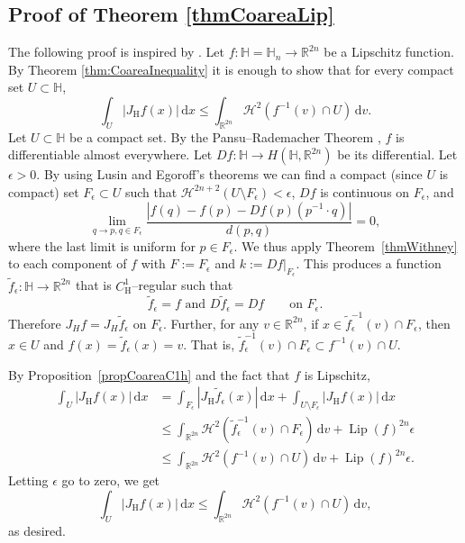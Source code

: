 \documentclass[12pt,reqno]{amsart}
\newcommand{\cH}{\mathcal{H}}
\newcommand{\JfH}{J_\mathrm{H}f}
\DeclareMathOperator{\Lip}{Lip}
\newcommand{\HH}{\mathbb{H}}
\newcommand{\R}{\mathbb{R}}
\newcommand{\ud}[0]{\,\mathrm{d}}
\newcommand{\from}{\colon}
\theoremstyle{remark}
\newcommand{\0}{\mathbf{0}}
\renewcommand{\1}{\mathbf 1}
\begin{document}
\subsection{Proof of Theorem \ref{thmCoareaLip}}

The following proof is inspired by \cite[Theorem 3.5]{MagnaniMathNachr}. Let $f\from \HH=\HH_n\to\mathbb R^{2n}$ be a Lipschitz function. By Theorem \ref{thm:CoareaInequality} it is enough to show that for every compact set $U\subset \HH$,
\begin{equation}\label{eqn:Sought}
    \int_U |\JfH(x)|\ud x \leq \int_{\mathbb R^{2n}}\mathcal{H}^2(f^{-1}(v)\cap U)\ud v.
    \end{equation}
Let $U\subset \HH$ be a compact set. By the Pansu--Rademacher Theorem \cite{Pansu, MagnaniPhD}, $f$ is differentiable almost everywhere. Let $Df\from \HH\to H(\HH,\mathbb R^{2n})$ be its differential. Let $\epsilon>0$. By using Lusin and Egoroff's theorems we can find a compact (since $U$ is compact) set $F_\epsilon\subset U$ such that $\cH^{2n+2}(U\setminus F_\epsilon)<\epsilon$, $Df$ is continuous on $F_\epsilon$, and
\[
    \lim_{q\to p, q\in F_\epsilon} \frac{|f(q)-f(p)-Df(p)(p^{-1}\cdot q)|}{d(p,q)}=0,
\]
where the last limit is uniform for $p\in F_\epsilon$. We thus apply Theorem~\ref{thmWithney} to each component of $f$ with $F:=F_\epsilon$ and $k:=Df|_{F_\epsilon}$. This produces a function $\tilde f_\epsilon\from \HH\to\mathbb R^{2n}$ that is $C^1_{\mathrm{H}}$--regular such that 
\begin{equation}\label{eqn:Fepsilon}
  \tilde f_\epsilon = f \text{ and } D\tilde f_\epsilon=Df \qquad \text{on $F_\epsilon$.}
\end{equation}
Therefore $J_Hf = J_H\tilde{f}_\epsilon$ on $F_\epsilon$. Further, for any $v\in \R^{2n}$, if $x\in \tilde f_\epsilon^{-1}(v)\cap F_\epsilon$, then $x\in U$ and $f(x) = \tilde f_{\epsilon}(x) = v$. That is, $\tilde f_\epsilon^{-1}(v)\cap F_\epsilon \subset f^{-1}(v)\cap U$.

By Proposition~\ref{propCoareaC1h} and the fact that $f$ is Lipschitz,
\begin{align*}
  \int_{U} |J_{\mathrm{H}}f(x)|\ud x & = \int_{F_\epsilon} |J_{\mathrm{H}}\tilde{f}_\epsilon(x)|\ud x + \int_{U\setminus F_\epsilon} |J_{\mathrm{H}}f(x)|\ud x\\
  & \le \int_{\mathbb R^{2n}} \cH^2(\tilde f_\epsilon^{-1}(v)\cap F_\epsilon)\ud v + \Lip(f)^{2n} \epsilon \\
  & \le \int_{\mathbb R^{2n}} \cH^2(f^{-1}(v)\cap U)\ud v + \Lip(f)^{2n} \epsilon.
\end{align*}
Letting $\epsilon$ go to zero, we get 
\[
\int_U |J_{\mathrm H}f(x)|\ud x \le \int_{\mathbb R^{2n}} \cH^2(f^{-1}(v)\cap U)\ud v,
\]
as desired.
\end{document}

